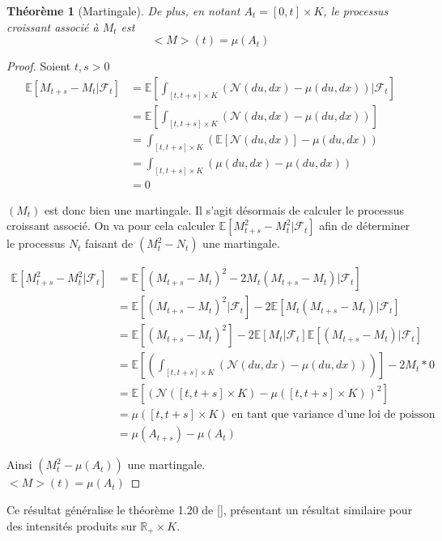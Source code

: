 \documentclass[12pt,a4paper]{article}
\newcommand{\E}[1]{\mathbb{E}\left[ #1 \right]}
\newcommand{\R}{\mathbb{R}}
\newcommand{\1}[1]{\mathbbm{1}_{\{#1\}} }
\newtheorem{theorem}{Théorème}
\theoremstyle{definition}
\begin{document}
{\begin{theorem}[Martingale]
De plus, en notant $A_t = [0,t] \times K$, le processus croissant associé à $M_t$ est 
$$<M>(t) = \mu(A_t)$$

\end{theorem}


\begin{proof}{}

Soient $t,s>0$
\begin{align*}
\E{M_{t+s} - M_t|\mathcal{F}_t} &= \E{\int_{[t,t+s] \times K} \left(\mathcal{N}(du,dx) - \mu(du,dx)\right)|\mathcal{F}_t}\\
&= \E{\int_{[t,t+s] \times K} \left(\mathcal{N}(du,dx) - \mu(du,dx)\right)}\\
&=\int_{[t,t+s] \times K} \left(\E{\mathcal{N}(du,dx)} - \mu(du,dx)\right)\\
&=\int_{[t,t+s] \times K} \left(\mu(du,dx) - \mu(du,dx)\right)\\
&= 0
\end{align*}

$(M_t)$ est donc bien une martingale.
Il s'agit désormais de calculer le processus croissant associé. On va pour cela calculer $\E{M_{t+s}^2 - M_t^2|\mathcal{F}_t}$ afin de déterminer le processus $N_t$ faisant de $(M_t^2-N_t)$ une martingale.

\begin{align*}
\E{M_{t+s}^2 - M_t^2|\mathcal{F}_t} &= \E{(M_{t+s} - M_t)^2 - 2 M_t(M_{t+s} - M_t)|\mathcal{F}_t}\\
&= \E{(M_{t+s} - M_t)^2|\mathcal{F}_t} - 2 \E{M_t(M_{t+s} - M_t)|\mathcal{F}_t}\\
&= \E{(M_{t+s} - M_t)^2} - 2 \E{M_t|\mathcal{F}_t} \E{(M_{t+s} - M_t)|\mathcal{F}_t}\\
&= \E{\left(\int_{[t,t+s] \times K} \left(\mathcal{N}(du,dx) - \mu(du,dx)\right)\right)} - 2 M_t*0 \\
&= \E{\left(\mathcal{N}([t,t+s]\times K) - \mu([t,t+s]\times K)\right)^2} \\
&= \mu([t,t+s]\times K) \text{ en tant que variance d'une loi de poisson}\\
&= \mu(A_{t+s}) - \mu(A_{t})
\end{align*}

Ainsi $(M_t^2-\mu(A_{t}))$ une martingale.\\
$<M>(t) = \mu(A_{t})$


\end{proof}
Ce résultat généralise le théorème 1.20 de [], présentant un résultat similaire pour des intensités produits sur $\R_+ \times K$.


}
\end{document}
